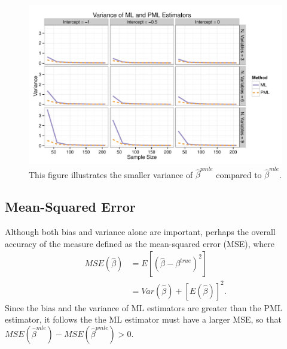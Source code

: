 \documentclass[12pt]{article}
\begin{document}
\begin{figure}[h]
\begin{center}
\includegraphics[width = \textwidth]{figs/sims-var.pdf}
\caption{This figure illustrates the smaller variance of $\hat{\beta}^{pmle}$ compared to $\hat{\beta}^{mle}$.}\label{fig:sims-var}
\end{center}
\end{figure}

\subsection*{Mean-Squared Error}

Although both bias and variance alone are important, perhaps the overall accuracy of the measure defined as the mean-squared error (MSE), where
\begin{align}\label{eqn:mse}
MSE(\hat{\beta}) &= E[(\hat{\beta} - \beta^{true})^2] \nonumber\\
                            &= Var(\hat{\beta}) + [E(\hat{\beta})]^2 \text{.}
\end{align}
Since the bias and the variance of ML estimators are greater than the PML estimator, it follows the the ML estimator must have a larger MSE, so that $MSE(\hat{\beta}^{mle}) - MSE(\hat{\beta}^{pmle}) > 0$. 
\end{document}
